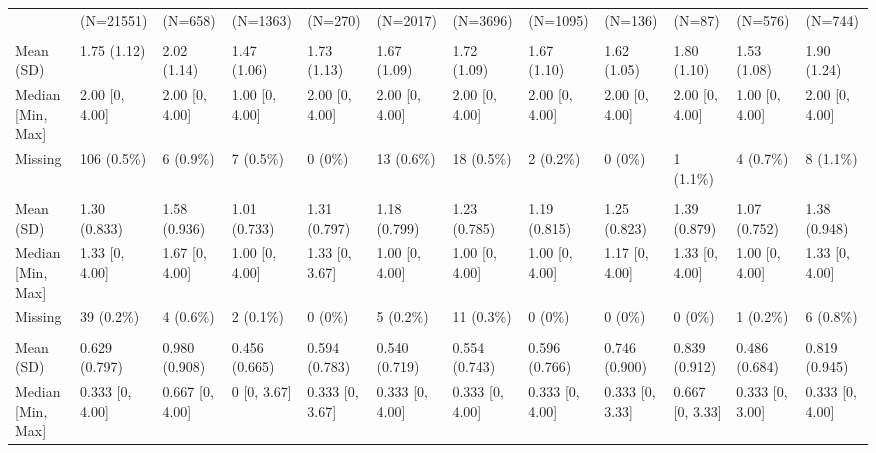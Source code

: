 \documentclass[
  single column]{article}
\begin{document}
\begin{landscape}
\begin{longtable}[t]{llllllllllll}
\endfoot
\bottomrule
\endlastfoot
 & (N=21551) & (N=658) & (N=1363) & (N=270) & (N=2017) & (N=3696) & (N=1095) & (N=136) & (N=87) & (N=576) & (N=744)\\
\addlinespace[0.3em]
\multicolumn{12}{l}{\textbf{Fatigue}}\\
\hspace{1em}Mean (SD) & 1.75 (1.12) & 2.02 (1.14) & 1.47 (1.06) & 1.73 (1.13) & 1.67 (1.09) & 1.72 (1.09) & 1.67 (1.10) & 1.62 (1.05) & 1.80 (1.10) & 1.53 (1.08) & 1.90 (1.24)\\
\hspace{1em}Median [Min, Max] & 2.00 [0, 4.00] & 2.00 [0, 4.00] & 1.00 [0, 4.00] & 2.00 [0, 4.00] & 2.00 [0, 4.00] & 2.00 [0, 4.00] & 2.00 [0, 4.00] & 2.00 [0, 4.00] & 2.00 [0, 4.00] & 1.00 [0, 4.00] & 2.00 [0, 4.00]\\
\hspace{1em}Missing & 106 (0.5\%) & 6 (0.9\%) & 7 (0.5\%) & 0 (0\%) & 13 (0.6\%) & 18 (0.5\%) & 2 (0.2\%) & 0 (0\%) & 1 (1.1\%) & 4 (0.7\%) & 8 (1.1\%)\\
\addlinespace[0.3em]
\multicolumn{12}{l}{\textbf{Anxiety}}\\
\hspace{1em}Mean (SD) & 1.30 (0.833) & 1.58 (0.936) & 1.01 (0.733) & 1.31 (0.797) & 1.18 (0.799) & 1.23 (0.785) & 1.19 (0.815) & 1.25 (0.823) & 1.39 (0.879) & 1.07 (0.752) & 1.38 (0.948)\\
\hspace{1em}Median [Min, Max] & 1.33 [0, 4.00] & 1.67 [0, 4.00] & 1.00 [0, 4.00] & 1.33 [0, 3.67] & 1.00 [0, 4.00] & 1.00 [0, 4.00] & 1.00 [0, 4.00] & 1.17 [0, 4.00] & 1.33 [0, 4.00] & 1.00 [0, 4.00] & 1.33 [0, 4.00]\\
\hspace{1em}Missing & 39 (0.2\%) & 4 (0.6\%) & 2 (0.1\%) & 0 (0\%) & 5 (0.2\%) & 11 (0.3\%) & 0 (0\%) & 0 (0\%) & 0 (0\%) & 1 (0.2\%) & 6 (0.8\%)\\
\addlinespace[0.3em]
\multicolumn{12}{l}{\textbf{Depression}}\\
\hspace{1em}Mean (SD) & 0.629 (0.797) & 0.980 (0.908) & 0.456 (0.665) & 0.594 (0.783) & 0.540 (0.719) & 0.554 (0.743) & 0.596 (0.766) & 0.746 (0.900) & 0.839 (0.912) & 0.486 (0.684) & 0.819 (0.945)\\
\hspace{1em}Median [Min, Max] & 0.333 [0, 4.00] & 0.667 [0, 4.00] & 0 [0, 3.67] & 0.333 [0, 3.67] & 0.333 [0, 4.00] & 0.333 [0, 4.00] & 0.333 [0, 4.00] & 0.333 [0, 3.33] & 0.667 [0, 3.33] & 0.333 [0, 3.00] & 0.333 [0, 4.00]\\

\end{longtable}
\end{landscape}
\end{document}
